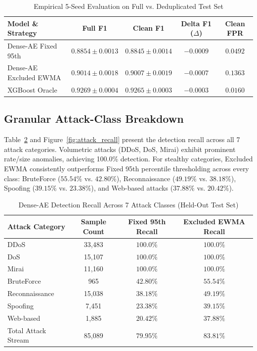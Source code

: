 \documentclass{ieeeaccess}
\begin{document}
\begin{table}[h]
\centering
\caption{Empirical 5-Seed Evaluation on Full vs. Deduplicated Test Set}
\label{tab:dedup_eval}
\begin{tabular}{lcccc}
\toprule
Model \& Strategy & Full F1 & Clean F1 & Delta F1 ($\Delta$) & Clean FPR \\
\midrule
Dense-AE Fixed 95th & $0.8854 \pm 0.0013$ & $0.8845 \pm 0.0014$ & $-0.0009$ & $0.0492$ \\
Dense-AE Excluded EWMA & $0.9014 \pm 0.0018$ & $0.9007 \pm 0.0019$ & $-0.0007$ & $0.1363$ \\
XGBoost Oracle & $0.9269 \pm 0.0004$ & $0.9265 \pm 0.0003$ & $-0.0003$ & $0.0160$ \\
\bottomrule
\end{tabular}
\end{table}

\subsection{Granular Attack-Class Breakdown}
Table~\ref{tab:attack_breakdown} and Figure~\ref{fig:attack_recall} present the detection recall across all 7 attack categories. Volumetric attacks (DDoS, DoS, Mirai) exhibit prominent rate/size anomalies, achieving 100.0\% detection. For stealthy categories, Excluded EWMA consistently outperforms Fixed 95th percentile thresholding across every class: BruteForce ($55.54\%$ vs. $42.80\%$), Reconnaissance ($49.19\%$ vs. $38.18\%$), Spoofing ($39.15\%$ vs. $23.38\%$), and Web-based attacks ($37.88\%$ vs. $20.42\%$).

\begin{table}[h]
\centering
\caption{Dense-AE Detection Recall Across 7 Attack Classes (Held-Out Test Set)}
\label{tab:attack_breakdown}
\begin{tabular}{lccc}
\toprule
Attack Category & Sample Count & Fixed 95th Recall & Excluded EWMA Recall \\
\midrule
DDoS & 33,483 & $100.0\%$ & $100.0\%$ \\
DoS & 15,107 & $100.0\%$ & $100.0\%$ \\
Mirai & 11,160 & $100.0\%$ & $100.0\%$ \\
BruteForce & 965 & $42.80\%$ & $\mathbf{55.54\%}$ \\
Reconnaissance & 15,038 & $38.18\%$ & $\mathbf{49.19\%}$ \\
Spoofing & 7,451 & $23.38\%$ & $\mathbf{39.15\%}$ \\
Web-based & 1,885 & $20.42\%$ & $\mathbf{37.88\%}$ \\
\midrule
Total Attack Stream & 85,089 & $79.95\%$ & $\mathbf{83.81\%}$ \\
\bottomrule
\end{tabular}
\end{table}
\end{document}
